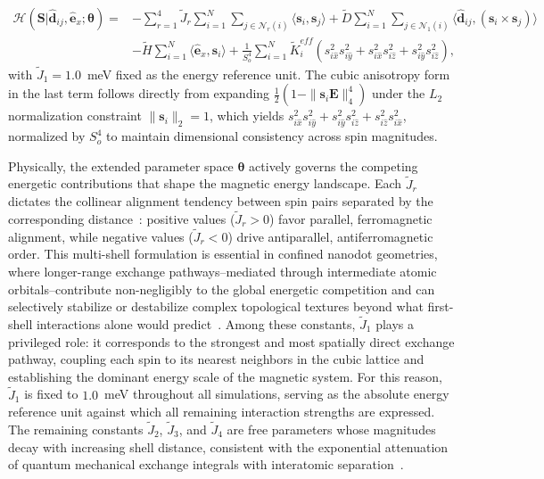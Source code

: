 \documentclass[a4paper,fleqn]{cas-sc}
\begin{document}
\begin{align}\label{eq:Hamiltonian}
\mathcal{H}\left(\mathbf{S}|\hat{\mathbf{d}}_{ij},\hat{\mathbf{e}}_x;
\boldsymbol{\theta}\right) = 
&- \sum_{r=1}^{4}\tilde{J}_r 
    \sum_{i=1}^{N}\sum_{j\in \mathcal{N}_r(i)} 
    \langle \mathbf{s}_i, \mathbf{s}_j \rangle \nonumber + \tilde{D} \sum_{i=1}^{N}\sum_{j\in \mathcal{N}_1(i)} 
    \langle \hat{\mathbf{d}}_{ij},(\mathbf{s}_i \times \mathbf{s}_j)
    \rangle \nonumber \\
&- \tilde{H} \sum_{i=1}^{N} 
    \langle \hat{\mathbf{e}}_x, \mathbf{s}_i \rangle \nonumber + \frac{1}{S_o^4}\sum_{i=1}^{N} \tilde{K}_i^{eff}
    \left(s_{i\hat{x}}^2 s_{i\hat{y}}^2 + 
          s_{i\hat{x}}^2 s_{i\hat{z}}^2 + 
          s_{i\hat{y}}^2 s_{i\hat{z}}^2\right),
\end{align}
with $\tilde{J}_1 = 1.0$~meV fixed as the energy reference unit. The cubic anisotropy form in the last term follows directly from expanding $\frac{1}{2}(1 - \|\mathbf{s}_i\mathbf{E}\|_4^4)$ under the $L_2$ normalization constraint $\|\mathbf{s}_i\|_2 = 1$, which 
yields $s_{i\hat{x}}^2 s_{i\hat{y}}^2 + s_{i\hat{y}}^2 
s_{i\hat{z}}^2 + s_{i\hat{z}}^2 s_{i\hat{x}}^2$, normalized by $S_o^4$ to maintain dimensional consistency across spin magnitudes.

Physically, the extended parameter space $\boldsymbol{\theta}$ actively governs the competing energetic contributions that shape the magnetic energy landscape. Each $\tilde{J}_r$ dictates the collinear alignment tendency between spin pairs separated by the corresponding distance~\cite{coey2010magnetism}: positive values ($\tilde{J}_r > 0$) favor parallel, ferromagnetic 
alignment, while negative values ($\tilde{J}_r < 0$) drive 
antiparallel, antiferromagnetic order. This multi-shell formulation is essential in confined nanodot geometries, where longer-range exchange pathways--mediated through intermediate atomic orbitals--contribute non-negligibly to the global energetic competition and can selectively stabilize or destabilize complex topological textures beyond what first-shell interactions alone would predict~\cite{eriksson2017atomistic}. Among these constants, $\tilde{J}_1$ plays a privileged role: it 
corresponds to the strongest and most spatially direct exchange pathway, coupling each spin to its nearest neighbors in the cubic lattice and establishing the dominant energy scale of the magnetic system. For this reason, $\tilde{J}_1$ is fixed to $1.0$~meV throughout all simulations, serving as the absolute energy reference unit against which all remaining interaction strengths are expressed. The remaining constants $\tilde{J}_2$, $\tilde{J}_3$, and $\tilde{J}_4$ are free parameters whose magnitudes decay with increasing shell distance, consistent with the exponential attenuation of quantum mechanical exchange integrals with interatomic separation~\cite{coey2010magnetism}.
\end{document}
